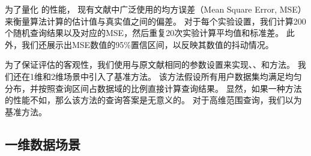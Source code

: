 为了量化 \myahead 的性能，
现有文献中广泛使用的均方误差（Mean Square Error, MSE）\cite{ye2019privkv, cormode2019answering, wang2019consistent} 来衡量算法计算的估计值与真实值之间的偏差。
对于每个实验设置，我们计算200个随机查询结果以及对应的MSE，然后重复20次实验计算平均值和标准差。
此外，我们还展示出MSE数值的95\%置信区间，以反映其数值的抖动情况。

为了保证评估的客观性，我们使用与原文献相同的参数设置来实现\myhio \cite{wang2019answering}、\mydht \cite{cormode2019answering}、\mycalm \cite{zhang2018calm}和\myHDG \cite{yang2020answering}方法。
我们还在1维和2维场景中引入了基准方法\myuni。
该方法假设所有用户数据集均满足均匀分布，并按照查询区间占数据域的比例直接计算查询结果。
显然，如果一种方法的性能不如\myuni ，那么该方法的查询答案是无意义的。
对于高维范围查询，我们以\myHDG 为基准方法。

\subsection{一维数据场景}
\label{Evaluation for 1-dim Range Query}

